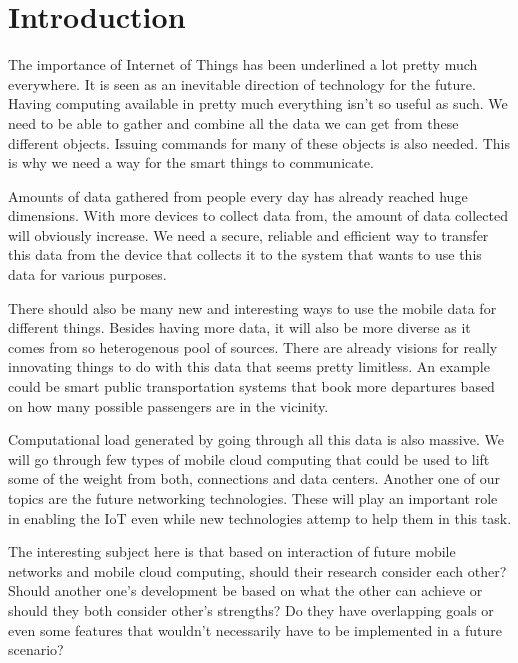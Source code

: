 \documentclass[conference]{IEEEtran}
\begin{document}
\section{Introduction}
The importance of Internet of Things has been underlined a lot pretty much everywhere. It is seen as an inevitable direction of technology for the future. Having computing available in pretty much everything isn't so useful as such. We need to be able to gather and combine all the data we can get from these different objects. Issuing commands for many of these objects is also needed. This is why we need a way for the smart things to communicate.
\par
Amounts of data gathered from people every day has already reached huge dimensions. With more devices to collect data from, the amount of data collected will obviously increase. We need a secure, reliable and efficient way to transfer this data from the device that collects it to the system that wants to use this data for various purposes.
\par
There should also be many new and interesting ways to use the mobile data for different things. Besides having more data, it will also be more diverse as it comes from so heterogenous pool of sources. There are already visions for really innovating things to do with this data that seems pretty limitless. An example could be smart public transportation systems that book more departures based on how many possible passengers are in the vicinity.
\par
Computational load generated by going through all this data is also massive. We will go through few types of mobile cloud computing that could be used to lift some of the weight from both, connections and data centers. Another one of our topics are the future networking technologies. These will play an important role in enabling the IoT even while new technologies attemp to help them in this task.
\par
The interesting subject here is that based on interaction of future mobile networks and mobile cloud computing, should their research consider each other? Should another one's development be based on what the other can achieve or should they both consider other's strengths? Do they have overlapping goals or even some features that wouldn't necessarily have to be implemented in a future scenario?
\end{document}
